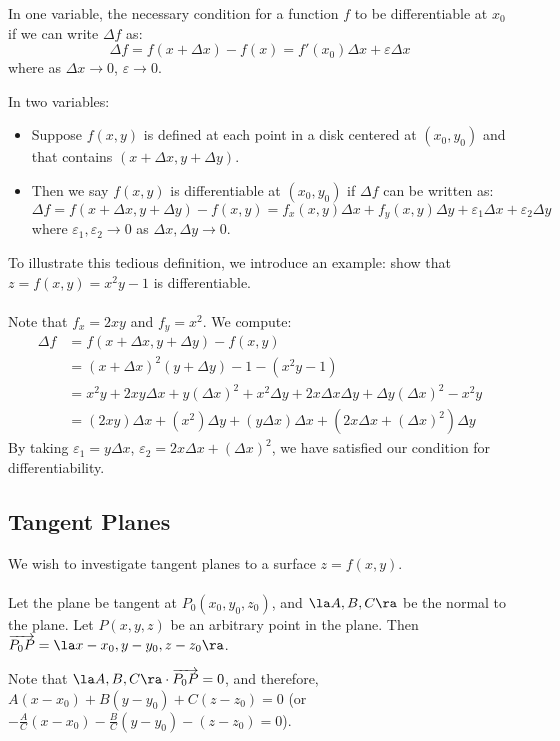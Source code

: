 \documentclass[12pt]{article}
\begin{document}
In one variable, the necessary condition for a function $f$ to be differentiable at $x_0$ if we can write $\Delta f$ as: \[ \Delta f = f(x+\Delta x) - f(x) = f'(x_0)\Delta x + \varepsilon \Delta x \] 
where as $\Delta x \to 0$, $\varepsilon \to 0$.

In two variables:
\begin{itemize}
\item Suppose $f(x,y)$ is defined at each point in a disk centered at $(x_0,y_0)$ and that contains $(x+\Delta x, y+\Delta y)$.
\item Then we say $f(x,y)$ is differentiable at $(x_0,y_0)$ if $\Delta f$ can be written as: \[ \Delta f = f(x+\Delta x,y+\Delta y) - f(x,y) = f_x(x,y) \Delta x + f_y(x,y) \Delta y + \varepsilon_1\Delta x + \varepsilon_2\Delta y \] where $\varepsilon_1,\varepsilon_2 \to 0$ as $\Delta x, \Delta y \to 0$.
\end{itemize}

To illustrate this tedious definition, we introduce an example: show that $z = f(x,y) = x^2y - 1$ is differentiable. \\ \\

Note that $f_x = 2xy$ and $f_y = x^2$. We compute:
\[
\begin{aligned}
\Delta f &= f(x+\Delta x,y + \Delta y) - f(x,y) \\
&= (x+\Delta x)^2(y+\Delta y) - 1 - (x^2y - 1) \\
&= x^2y + 2xy\Delta x + y(\Delta x)^2 + x^2\Delta y + 2x\Delta x \Delta y + \Delta y(\Delta x)^2 - x^2y \\
&= (2xy)\Delta x + (x^2)\Delta y + (y\Delta x)\Delta x + (2x\Delta x + (\Delta x)^2)\Delta y 
\end{aligned}
\]
By taking $\varepsilon_1 = y\Delta x$, $\varepsilon_2 = 2x\Delta x + (\Delta x)^2$, we have satisfied our condition for differentiability.

\subsection{Tangent Planes}
We wish to investigate tangent planes to a surface $z = f(x,y)$. \\ \\
Let the plane be tangent at $P_0(x_0,y_0,z_0)$, and $\la A,B,C \ra$ be the normal to the plane. Let $P(x,y,z)$ be an arbitrary point in the plane. Then $\overrightarrow{P_0P} = \la x-x_0, y-y_0, z-z_0 \ra$. 

Note that $\la A,B,C \ra \cdot \overrightarrow{P_0P} = 0$, and therefore, $A(x-x_0) + B(y-y_0) + C(z-z_0) = 0$ (or $-\frac{A}{C}(x-x_0) - \frac{B}{C}(y-y_0) - (z - z_0) = 0$). %
\end{document}
